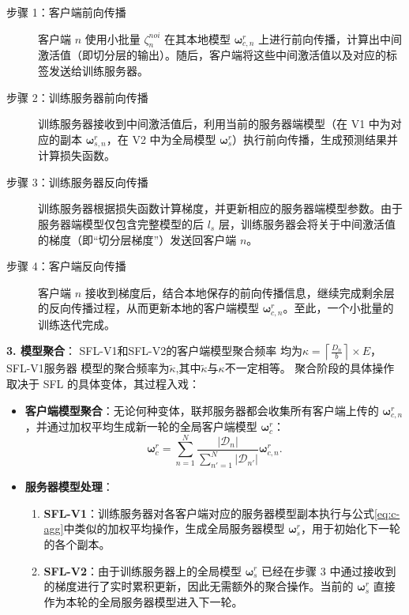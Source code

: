 \begin{description}
    \item[步骤 1：客户端前向传播] 
    客户端 $n$ 使用小批量 $\zeta_n^{noi}$ 在其本地模型 $\boldsymbol{\omega}_{c,n}^{r}$ 上进行前向传播，计算出中间激活值（即切分层的输出）。随后，客户端将这些中间激活值以及对应的标签发送给训练服务器。

    \item[步骤 2：训练服务器前向传播] 
    训练服务器接收到中间激活值后，利用当前的服务器端模型（在 V1 中为对应的副本 $\boldsymbol{\omega}_{s,n}^{r}$，在 V2 中为全局模型 $\boldsymbol{\omega}_s^{r}$）执行前向传播，生成预测结果并计算损失函数。

    \item[步骤 3：训练服务器反向传播] 
    训练服务器根据损失函数计算梯度，并更新相应的服务器端模型参数。由于服务器端模型仅包含完整模型的后 $l_s$ 层，训练服务器会将关于中间激活值的梯度（即“切分层梯度”）发送回客户端 $n$。

    \item[步骤 4：客户端反向传播] 
    客户端 $n$ 接收到梯度后，结合本地保存的前向传播信息，继续完成剩余层的反向传播过程，从而更新本地的客户端模型 $\boldsymbol{\omega}_{c,n}^{r}$。至此，一个小批量的训练迭代完成。
\end{description}


\textbf{3. 模型聚合}：
SFL-V1和SFL-V2的客户端模型聚合频率
均为$\kappa=\left\lceil \frac{D_n}{b} \right\rceil \times E$，SFL-V1服务器
模型的聚合频率为$\tilde{\kappa}$,其中$\tilde{\kappa}$与$\kappa$不一定相等。
聚合阶段的具体操作取决于 SFL 的具体变体，其过程入戏：
\begin{itemize}
    \item \textbf{客户端模型聚合}：无论何种变体，联邦服务器都会收集所有客户端上传的 $\boldsymbol{\omega}_{c,n}^{r}$，并通过加权平均生成新一轮的全局客户端模型 $\boldsymbol{\omega}_c^r$：
    \begin{equation}\label{eq:c-agg}
    \boldsymbol{\omega}_c^r=\sum_{n=1}^{N}\frac{|\mathcal{D}_n|}{\sum_{n'=1}^{N}|\mathcal{D}_{n'}|}\boldsymbol{\omega}_{c,n}^r.
    \end{equation}

    \item \textbf{服务器模型处理}：
    \begin{enumerate}
        \item \textbf{SFL-V1}：训练服务器对各客户端对应的服务器模型副本执行与公式\ref{eq:c-agg}中类似的加权平均操作，生成全局服务器模型 $\boldsymbol{\omega}_s^r$，用于初始化下一轮的各个副本。
        \item \textbf{SFL-V2}：由于训练服务器上的全局模型 $\boldsymbol{\omega}_s^{r}$ 已经在步骤 3 中通过接收到的梯度进行了实时累积更新，因此无需额外的聚合操作。当前的 $\boldsymbol{\omega}_s^{r}$ 直接作为本轮的全局服务器模型进入下一轮。
    \end{enumerate}
\end{itemize}

